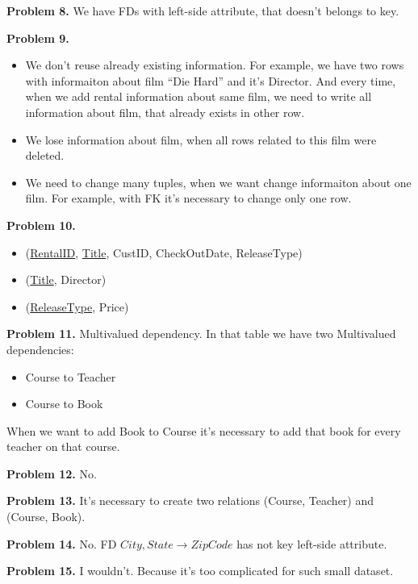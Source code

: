 \documentclass[a4paper,12pt]{article}
\newenvironment{problem}[1]{\par\bigskip\noindent\textbf{Problem #1.}
  \enskip\ignorespaces}{}
\begin{document}
  \begin{problem}{8}
    We have FDs with left-side attribute, that doesn't belongs to key.
  \end{problem}

  \begin{problem}{9}
    \begin{itemize}
      \item We don't reuse already existing information. For example, we have
        two rows with informaiton about film ``Die Hard'' and it's Director.
        And every time, when we add rental information about same film, we
        need to write all information about film, that already exists in
        other row.
      \item We lose information about film, when all rows related to this
        film were deleted.
      \item We need to change many tuples, when we want change informaiton
        about one film. For example, with FK it's necessary to change only
        one row.
    \end{itemize}
  \end{problem}

  \begin{problem}{10}
    \begin{itemize}
      \item (\underline{RentalID}, \underline{Title}, CustID, CheckOutDate, ReleaseType)
      \item (\underline{Title}, Director)
      \item (\underline{ReleaseType}, Price)
    \end{itemize}
  \end{problem}

  \begin{problem}{11}
    Multivalued dependency. In that table we have two Multivalued dependencies:
    \begin{itemize}
      \item Course to Teacher
      \item Course to Book
    \end{itemize}
    When we want to add Book to Course it's necessary to add that book
    for every teacher on that course.
  \end{problem}

  \begin{problem}{12}
    No.
  \end{problem}

  \begin{problem}{13}
    It's necessary to create two relations (Course, Teacher) and (Course, Book).
  \end{problem}

  \begin{problem}{14}
    No. FD $City, State \rightarrow ZipCode$ has not key left-side attribute.
  \end{problem}

  \begin{problem}{15}
    I wouldn't. Because it's too complicated for such small dataset.
  \end{problem}
\end{document}
